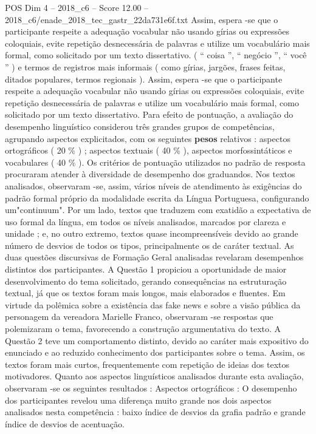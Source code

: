 \begin{textsample}{POS Dim 4 – 2018\_c6 – Score 12.00 – 2018\_c6/enade\_2018\_tec\_gastr\_22da731e6f.txt}
Assim, espera -se que o participante respeite a adequação vocabular não usando gírias ou expressões coloquiais, evite repetição desnecessária de palavras e utilize um vocabulário mais formal, como solicitado por um texto dissertativo. ( “ coisa ”, “ negócio ”, “ você ” ) e termos de registros mais informais ( como gírias, jargões, frases feitas, ditados populares, termos regionais ).
Assim, espera -se que o participante respeite a adequação vocabular não usando gírias ou expressões coloquiais, evite repetição desnecessária de palavras e utilize um vocabulário mais formal, como solicitado por um texto dissertativo.
Para efeito de pontuação, a avaliação do desempenho linguístico considerou três grandes grupos de competências, agrupando aspectos explicitados, com os seguintes \textbf{pesos} relativos : aspectos ortográficos ( 20 \% ) ; aspectos textuais ( 40 \% ), aspectos morfossintáticos e vocabulares ( 40 \% ).
Os critérios de pontuação utilizados no padrão de resposta procuraram atender à diversidade de desempenho dos graduandos.
Nos textos analisados, observaram -se, assim, vários níveis de atendimento às exigências do padrão formal próprio da modalidade escrita da Língua Portuguesa, configurando um"continuum".
Por um lado, textos que traduzem com exatidão a expectativa de uso formal da língua, em todos os níveis analisados, marcados por clareza e unidade ; e, no outro extremo, textos quase incompreensíveis devido ao grande número de desvios de todos os tipos, principalmente os de caráter textual.
As duas questões discursivas de Formação Geral analisadas revelaram desempenhos distintos dos participantes.
A Questão 1 propiciou a oportunidade de maior desenvolvimento do tema solicitado, gerando consequências na estruturação textual, já que os textos foram mais longos, mais elaborados e fluentes.
Em virtude da polêmica sobre a existência das fake news e sobre a visão pública da personagem da vereadora Marielle Franco, observaram -se respostas que polemizaram o tema, favorecendo a construção argumentativa do texto.
A Questão 2 teve um comportamento distinto, devido ao caráter mais expositivo do enunciado e ao reduzido conhecimento dos participantes sobre o tema.
Assim, os textos foram mais curtos, frequentemente com repetição de ideias dos textos motivadores.
Quanto aos aspectos linguísticos analisados durante esta avaliação, observaram -se os seguintes resultados : Aspectos ortográficos : O desempenho dos participantes revelou uma diferença muito grande nos dois aspectos analisados nesta competência : baixo índice de desvios da grafia padrão e grande índice de desvios de acentuação.

\end{textsample}
